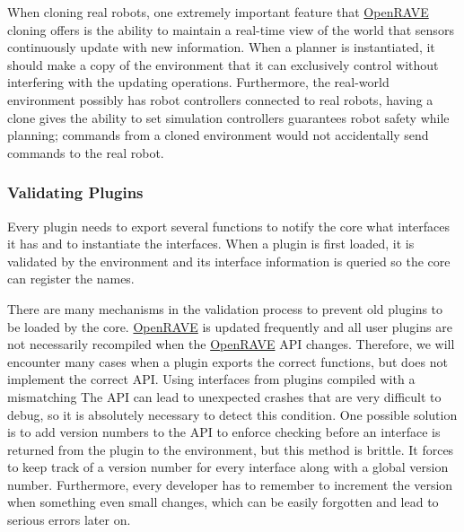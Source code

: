 When cloning real robots, one extremely important feature that \hyperlink{namespaceOpenRAVE}{OpenRAVE} cloning offers is the ability to maintain a real-\/time view of the world that sensors continuously update with new information. When a planner is instantiated, it should make a copy of the environment that it can exclusively control without interfering with the updating operations. Furthermore, the real-\/world environment possibly has robot controllers connected to real robots, having a clone gives the ability to set simulation controllers guarantees robot safety while planning; commands from a cloned environment would not accidentally send commands to the real robot.\hypertarget{architecture__concepts_arch_validating_plugins}{}\subsubsection{Validating Plugins}\label{architecture__concepts_arch_validating_plugins}
Every plugin needs to export several functions to notify the core what interfaces it has and to instantiate the interfaces. When a plugin is first loaded, it is validated by the environment and its interface information is queried so the core can register the names.

There are many mechanisms in the validation process to prevent old plugins to be loaded by the core. \hyperlink{namespaceOpenRAVE}{OpenRAVE} is updated frequently and all user plugins are not necessarily recompiled when the \hyperlink{namespaceOpenRAVE}{OpenRAVE} API changes. Therefore, we will encounter many cases when a plugin exports the correct functions, but does not implement the correct API. Using interfaces from plugins compiled with a mismatching The API can lead to unexpected crashes that are very difficult to debug, so it is absolutely necessary to detect this condition. One possible solution is to add version numbers to the API to enforce checking before an interface is returned from the plugin to the environment, but this method is brittle. It forces to keep track of a version number for every interface along with a global version number. Furthermore, every developer has to remember to increment the version when something even small changes, which can be easily forgotten and lead to serious errors later on.

